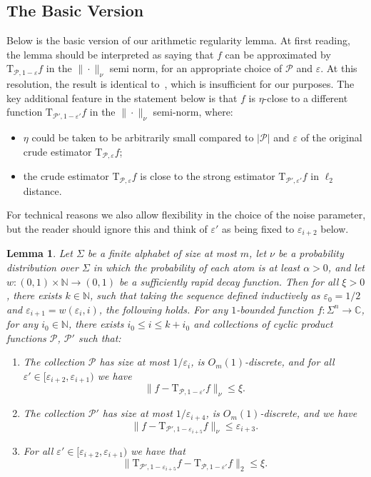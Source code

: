 \documentclass[10pt,a4paper]{amsart}
\newtheorem{lemma}[thm]{Lemma}
\newcommand\card[1]{\left| {#1} \right|}
\newcommand\norm[1]{\| #1 \|}
\newcommand\eps{\varepsilon}
\renewcommand\leq{\leqslant}
\begin{document}
\subsection{The Basic Version}
Below is the basic version of our arithmetic regularity lemma. At first reading, the lemma should be interpreted as saying that $f$ can be approximated by $\mathrm{T}_{\mathcal{P},1-\eps}f$  in the $\|\cdot\|_{\nu}$ semi norm, for an appropriate choice of $\mathcal{P}$ and $\eps$. 
At this resolution, the result is identical to~\cite[Lemma 5.3]{BKM5}, which is insufficient for our purposes.
The key additional feature in the statement below is that $f$ is $\eta$-close to a different function  $\mathrm{T}_{\mathcal{P}',1-\eps'} f$ in the $\|\cdot\|_{\nu}$ semi-norm, where:
\begin{itemize}
    \item $\eta$ could be taken to be arbitrarily small compared to $\card{\mathcal{P}}$ and $\eps$ of the original crude estimator $\mathrm{T}_{\mathcal{P},\eps} f$;
    \item the crude estimator $\mathrm{T}_{\mathcal{P},\eps} f$ is close to the strong estimator $\mathrm{T}_{\mathcal{P}',\eps'} f$ in $\ell_2$ distance.
\end{itemize}
For technical reasons we also allow flexibility in the choice of the noise parameter, but the reader should ignore this and think of $\eps'$ as being fixed to $\eps_{i+2}$ below.
\begin{lemma}\label{lem:arithmetic_reg}
    Let $\Sigma$ be a finite alphabet of size at most $m$, let $\nu$ be a probability distribution over $\Sigma$ in which the probability of each atom is at least $\alpha>0$, and let $w\colon (0,1)\times\mathbb{N}\to(0,1)$ be a sufficiently rapid decay function. Then for all $\xi>0$, there exists  $k\in\mathbb{N}$, such that taking the sequence defined inductively as $\eps_0 = 1/2$ and $\eps_{i+1} = w(\eps_i,i)$, the following holds. For any $1$-bounded function $f\colon \Sigma^n\to\mathbb{C}$, for any $i_0\in\mathbb{N}$, there exists $i_0\leq i\leq k+i_0$ and collections of cyclic product functions $\mathcal{P}$, $\mathcal{P}'$ such that:
    \begin{enumerate}
        \item The collection $\mathcal{P}$ has size at most $1/\eps_{i}$, is $O_{m}(1)$-discrete, and for all $\eps'\in [\eps_{i+2},\eps_{i+1})$ we have
        \[
        \norm{f-\mathrm{T}_{\mathcal{P},1-\eps'}f}_{\nu}\leq \xi.
        \] 
        \item The collection $\mathcal{P}'$ has size at most $1/\eps_{i+4}$, is $O_{m}(1)$-discrete, and we have
        \[
        \norm{f-\mathrm{T}_{\mathcal{P}',1-\eps_{i+5}}f}_{\nu}\leq \eps_{i+3}.
        \]
        \item For all $\eps'\in [\eps_{i+2},\eps_{i+1})$ we have that 
        \[
        \norm{\mathrm{T}_{\mathcal{P}',1-\eps_{i+5}}f -\mathrm{T}_{\mathcal{P},1-\eps'} f}_2\leq \xi.
        \]
    \end{enumerate}
\end{lemma}
\end{document}
